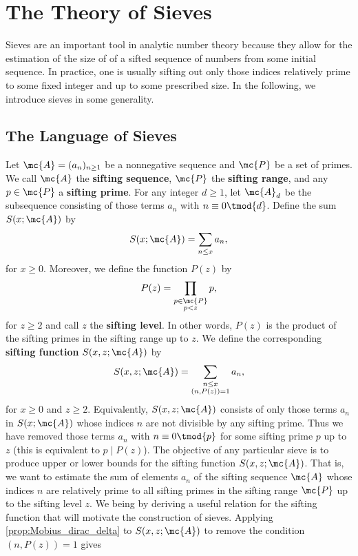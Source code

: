 \chapter{The Theory of Sieves}
  Sieves are an important tool in analytic number theory because they allow for the estimation of the size of of a sifted sequence of numbers from some initial sequence. In practice, one is usually sifting out only those indices relatively prime to some fixed integer and up to some prescribed size. In the following, we introduce sieves in some generality.
  \section{The Language of Sieves}
    Let $\mc{A} = (a_{n})_{n \ge 1}$ be a nonnegative sequence and $\mc{P}$ be a set of primes. We call $\mc{A}$ the \textbf{sifting sequence}, $\mc{P}$ the \textbf{sifting range}, and any $p \in \mc{P}$ a \textbf{sifting prime}. For any integer $d \ge 1$, let $\mc{A}_{d}$ be the subsequence consisting of those terms $a_{n}$ with $n \equiv 0 \tmod{d}$. Define the sum $S(x;\mc{A})$ by
    \[
      S(x;\mc{A}) = \sum_{\substack{n \le x}}a_{n},
    \]
    for $x \ge 0$.  Moreover, we define the function $P(z)$ by
    \[
      P(z) = \prod_{\substack{p \in \mc{P} \\ p < z}}p,
    \]
    for $z \ge 2$ and call $z$ the \textbf{sifting level}. In other words, $P(z)$ is the product of the sifting primes in the sifting range up to $z$. We define the corresponding \textbf{sifting function} $S(x,z;\mc{A})$ by
    \[
      S(x,z;\mc{A}) = \sum_{\substack{n \le x \\ (n,P(z)) = 1}}a_{n},
    \]
    for $x \ge 0$ and $z \ge 2$. Equivalently, $S(x,z;\mc{A})$ consists of only those terms $a_{n}$ in $S(x;\mc{A})$ whose indices $n$ are not divisible by any sifting prime. Thus we have removed those terms $a_{n}$ with $n \equiv 0 \tmod{p}$ for some sifting prime $p$ up to $z$ (this is equivalent to $p \mid P(z)$). The objective of any particular sieve is to produce upper or lower bounds for the sifting function $S(x,z;\mc{A})$. That is, we want to estimate the sum of elements $a_{n}$ of the sifting sequence $\mc{A}$ whose indices $n$ are relatively prime to all sifting primes in the sifting range $\mc{P}$ up to the sifting level $z$. We being by deriving a useful relation for the sifting function that will motivate the construction of sieves. Applying \cref{prop:Mobius_dirac_delta} to $S(x,z;\mc{A})$ to remove the condition $(n,P(z)) = 1$ gives
